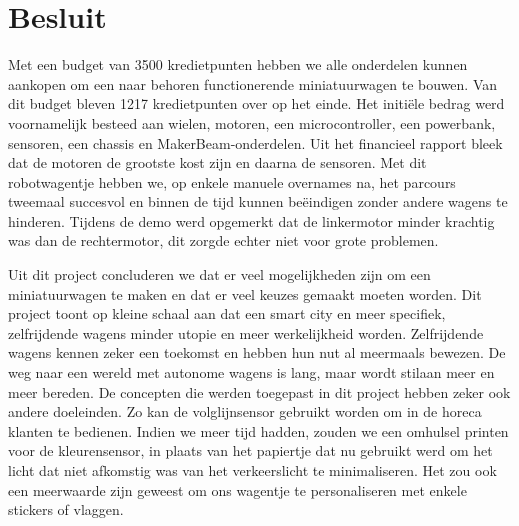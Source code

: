 \documentclass[a4paper,kulak]{kulakarticle}
\begin{document}
\section{Besluit}


Met een budget van 3500 kredietpunten hebben we alle onderdelen kunnen aankopen om een naar behoren functionerende miniatuurwagen te bouwen. Van dit budget bleven 1217 kredietpunten over op het einde. Het initiële bedrag werd voornamelijk besteed aan wielen, motoren, een microcontroller, een powerbank, sensoren, een chassis en MakerBeam-onderdelen. Uit het financieel rapport bleek dat de motoren de grootste kost zijn en daarna de sensoren. 
Met dit robotwagentje hebben we, op enkele manuele overnames na, het parcours tweemaal succesvol en binnen de tijd kunnen beëindigen zonder andere wagens te hinderen. Tijdens de demo werd opgemerkt dat de linkermotor minder krachtig was dan de rechtermotor, dit zorgde echter niet voor grote problemen. 

Uit dit project concluderen we dat er veel mogelijkheden zijn om een miniatuurwagen te maken en dat er veel keuzes gemaakt moeten worden. Dit project toont op kleine schaal aan dat een smart city en meer specifiek, zelfrijdende wagens minder utopie en meer werkelijkheid worden. Zelfrijdende wagens kennen zeker een toekomst en hebben hun nut al meermaals bewezen. De weg naar een wereld met autonome wagens is lang, maar wordt stilaan meer en meer bereden. De concepten die werden toegepast in dit project hebben zeker ook andere doeleinden. Zo kan de volglijnsensor gebruikt worden om in de horeca klanten te bedienen. 
Indien we meer tijd hadden, zouden we een omhulsel printen voor de kleurensensor, in plaats van het papiertje dat nu gebruikt werd om het licht dat niet afkomstig was van het verkeerslicht te minimaliseren. Het zou ook een meerwaarde zijn geweest om ons wagentje te personaliseren met enkele stickers of vlaggen. 



\end{document}

